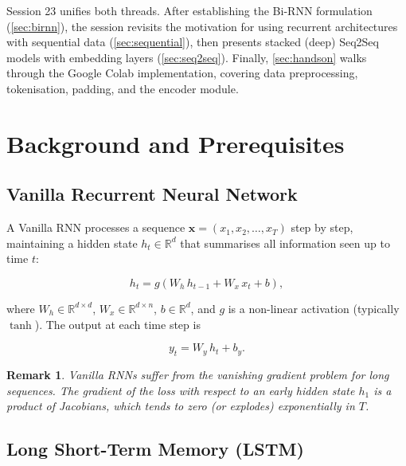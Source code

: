 \documentclass[12pt,a4paper]{article}
\newtheorem{remark}{Remark}[section]
\begin{document}
Session 23 unifies both threads.  After establishing the Bi-RNN formulation
(\cref{sec:birnn}), the session revisits the motivation for using recurrent
architectures with sequential data (\cref{sec:sequential}), then presents
stacked (deep) Seq2Seq models with embedding layers (\cref{sec:seq2seq}).
Finally, \cref{sec:handson} walks through the Google Colab implementation,
covering data preprocessing, tokenisation, padding, and the encoder module.

\section{Background and Prerequisites}
\label{sec:background}

\subsection{Vanilla Recurrent Neural Network}
\label{subsec:rnn_vanilla}

A Vanilla RNN processes a sequence $\mathbf{x} = (x_1, x_2, \ldots, x_T)$
step by step, maintaining a hidden state $h_t \in \mathbb{R}^d$ that summarises
all information seen up to time $t$:

\begin{equation}
  h_t = g\!\left(W_h\,h_{t-1} + W_x\,x_t + b\right),
  \label{eq:rnn_update}
\end{equation}

where $W_h \in \mathbb{R}^{d \times d}$, $W_x \in \mathbb{R}^{d \times n}$,
$b \in \mathbb{R}^{d}$, and $g$ is a non-linear activation (typically
$\tanh$).  The output at each time step is

\begin{equation}
  y_t = W_y\,h_t + b_y.
  \label{eq:rnn_output}
\end{equation}

\begin{remark}
  \label{rem:vanishing}
  Vanilla RNNs suffer from the \emph{vanishing gradient} problem for long
  sequences.  The gradient of the loss with respect to an early hidden state
  $h_1$ is a product of Jacobians, which tends to zero (or explodes)
  exponentially in $T$.
\end{remark}

\subsection{Long Short-Term Memory (LSTM)}
\label{subsec:lstm}
\end{document}
